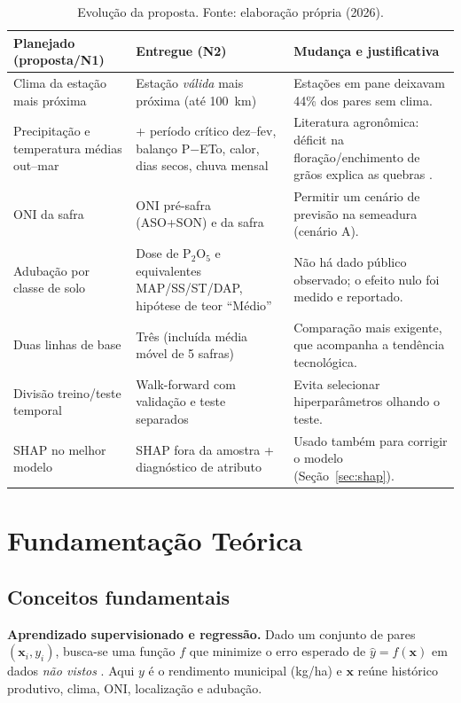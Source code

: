 \documentclass[12pt]{article}
\begin{document}
\begin{table}[ht]
\centering
\caption{Evolução da proposta. Fonte: elaboração própria (2026).}
\label{tab:evolucao}
\footnotesize
\begin{tabular}{|p{3.6cm}|p{4.6cm}|p{5.0cm}|}
\hline
\textbf{Planejado (proposta/N1)} & \textbf{Entregue (N2)} & \textbf{Mudança e justificativa} \\ \hline
Clima da estação mais próxima & Estação \emph{válida} mais próxima (até 100~km) & Estações em pane deixavam 44\% dos pares sem clima. \\ \hline
Precipitação e temperatura médias out--mar & + período crítico dez--fev, balanço P$-$ETo, calor, dias secos, chuva mensal & Literatura agronômica: déficit na floração/enchimento de grãos explica as quebras \cite{farias2007}. \\ \hline
ONI da safra & ONI pré-safra (ASO+SON) e da safra & Permitir um cenário de previsão na semeadura (cenário A). \\ \hline
Adubação por classe de solo & Dose de P$_2$O$_5$ e equivalentes MAP/SS/ST/DAP, hipótese de teor ``Médio'' & Não há dado público observado; o efeito nulo foi medido e reportado. \\ \hline
Duas linhas de base & Três (incluída média móvel de 5 safras) & Comparação mais exigente, que acompanha a tendência tecnológica. \\ \hline
Divisão treino/teste temporal & Walk-forward com validação e teste separados & Evita selecionar hiperparâmetros olhando o teste. \\ \hline
SHAP no melhor modelo & SHAP fora da amostra + diagnóstico de atributo & Usado também para corrigir o modelo (Seção~\ref{sec:shap}). \\ \hline
\end{tabular}
\end{table}

\section{Fundamentação Teórica}

\subsection{Conceitos fundamentais}

\textbf{Aprendizado supervisionado e regressão.} Dado um conjunto de pares
$(\mathbf{x}_i, y_i)$, busca-se uma função $f$ que minimize o erro esperado
de $\hat{y}=f(\mathbf{x})$ em dados \emph{não vistos}
\cite{hastie2009}. Aqui $y$ é o rendimento municipal (kg/ha) e
$\mathbf{x}$ reúne histórico produtivo, clima, ONI, localização e adubação.
\end{document}
